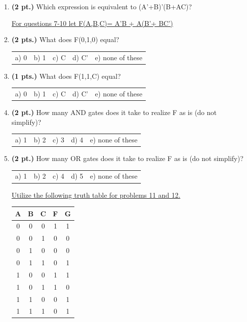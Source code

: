 \documentclass{article}
\begin{document}
\begin{enumerate}
\item {\bf (2 pt.)} Which expression is equivalent to (A'+B)'(B+AC)?

\pagebreak

\underline{For questions 7-10 let F(A,B,C)= A'B + A(B'+ BC')}

\item {\bf (2 pts.)} What does F(0,1,0) equal?

\begin{tabular}{p{0.7in} p{0.7in} p{0.7in} p{0.7in} l}
a) 0 & b) 1 & c) C & d) C' & e) none of these
\end{tabular}

\item {\bf (1 pts.)} What does F(1,1,C) equal?

\begin{tabular}{p{0.7in} p{0.7in} p{0.7in} p{0.7in} l}
a) 0 & b) 1 & c) C & d) C' & e) none of these
\end{tabular}

\item {\bf (2 pt.)} How many AND gates does it take to realize F
as is (do not simplify)?

\begin{tabular}{p{0.7in} p{0.7in} p{0.7in} p{0.7in} l}
a) 1 & b) 2 & c) 3 & d) 4 & e) none of these
\end{tabular}

\item {\bf (2 pt.)} How many OR gates does it take to realize F
as is (do not simplify)?

\begin{tabular}{p{0.7in} p{0.7in} p{0.7in} p{0.7in} l}
a) 1 & b) 2 & c) 4 & d) 5 & e) none of these
\end{tabular}

\underline{Utilize the following truth table for problems 11 and 12.}

\begin{tabular}{c|c|c||c|c}
A & B & C & F & G \\ \hline \hline
0 & 0 & 0 & 1 & 1 \\ \hline
0 & 0 & 1 & 0 & 0 \\ \hline
0 & 1 & 0 & 0 & 0 \\ \hline
0 & 1 & 1 & 0 & 1 \\ \hline
1 & 0 & 0 & 1 & 1 \\ \hline
1 & 0 & 1 & 1 & 0 \\ \hline
1 & 1 & 0 & 0 & 1 \\ \hline
1 & 1 & 1 & 0 & 1 \\
\end{tabular} 


\end{enumerate}
\end{document}
